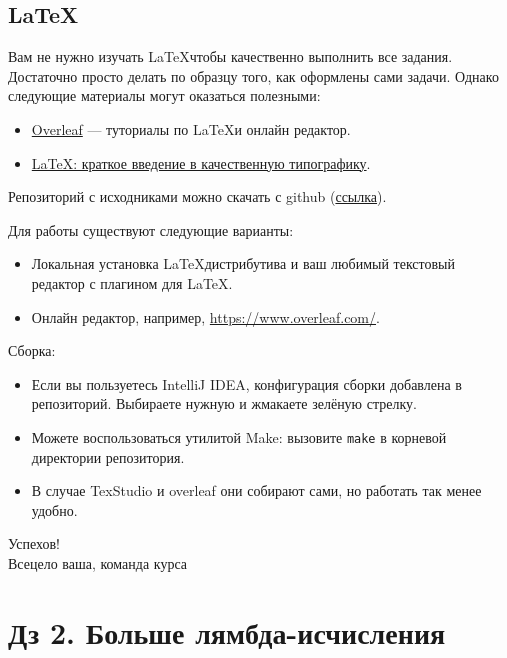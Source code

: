 \documentclass{article}
\begin{document}
    \subsection*{\LaTeX}

    Вам не нужно изучать \LaTeX чтобы качественно выполнить все задания.
    Достаточно просто делать по образцу того, как оформлены сами задачи.
    Однако следующие материалы могут оказаться полезными:

    \begin{itemize}
        \item \href{https://www.overleaf.com/learn}{Overleaf} --- туториалы по \LaTeX и онлайн редактор.
        \item \href{https://youtu.be/NOslSvJs29I}{LaTeX: краткое введение в качественную типографику}.
    \end{itemize}

    Репозиторий с исходниками можно скачать с github (\href{https://github.com/fpcourse-materials/lambda-hws}{ссылка}).

    Для работы существуют следующие варианты:
    \begin{itemize}
        \item Локальная установка \LaTeX дистрибутива и ваш любимый текстовый редактор с плагином для \LaTeX.
        \item Онлайн редактор, например, \url{https://www.overleaf.com/}.
    \end{itemize}

    Сборка:
    \begin{itemize}
        \item Если вы пользуетесь IntelliJ IDEA, конфигурация сборки добавлена в репозиторий.
        Выбираете нужную и жмакаете зелёную стрелку.
        \item Можете воспользоваться утилитой Make: вызовите \texttt{make} в корневой директории репозитория.
        \item В случае TexStudio и overleaf они собирают сами, но работать так менее удобно.
    \end{itemize}

    \begin{flushright}
        Успехов! \\
        Всецело ваша, команда курса
    \end{flushright}

    \newpage


    \section*{Дз 2. Больше лямбда-исчисления}
\end{document}
